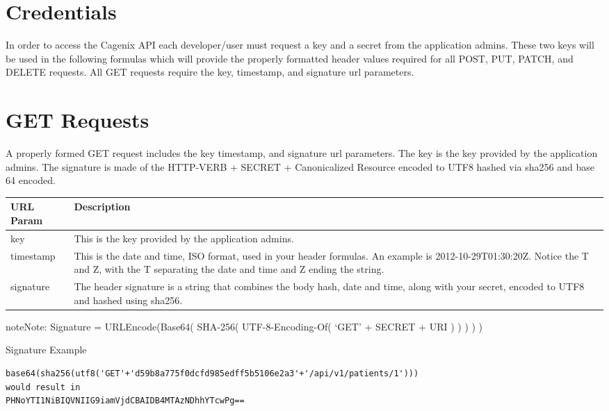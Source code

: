 \documentclass[letterpaper,10pt,english]{sphinxmanual}
\begin{document}
\section{Credentials}
\label{dev-api-overview:credentials}
In order to access the Cagenix API each developer/user must request a key and
a secret from the application admins. These two keys will be used in the
following formulas which will provide the properly formatted header values
required for all POST, PUT, PATCH, and DELETE requests. All GET requests require
the key, timestamp, and signature url parameters.


\section{GET Requests}
\label{dev-api-overview:get-requests}
A properly formed GET request includes the key timestamp, and signature url
parameters. The key is the key provided by the application admins.  The
signature is made of the HTTP-VERB + SECRET + Canonicalized Resource encoded to
UTF8 hashed via sha256 and base 64 encoded.

\begin{tabulary}{\linewidth}{|L|L|}
\hline
\textsf{\relax 
URL Param
} & \textsf{\relax 
Description
}\\
\hline
key
 & 
This is the key provided by the application admins.
\\

timestamp
 & 
This is the date and time, ISO format, used in your
header formulas. An example is 2012-10-29T01:30:20Z.
Notice the T and Z, with the T separating the date and
time and Z ending the string.
\\

signature
 & 
The header signature is a string that combines the body
hash, date and time, along with your secret, encoded to
UTF8 and hashed using sha256.
\\
\hline\end{tabulary}


\begin{notice}{note}{Note:}
Signature = URLEncode(Base64( SHA-256( UTF-8-Encoding-Of( `GET' + SECRET + URI ) ) ) ) )
\end{notice}

Signature Example

\begin{Verbatim}[commandchars=\\\{\}]
base64(sha256(utf8('GET'+'d59b8a775f0dcfd985edff5b5106e2a3'+'/api/v1/patients/1')))
would result in
PHNoYTI1NiBIQVNIIG9iamVjdCBAIDB4MTAzNDhhYTcwPg==
\end{Verbatim}
\end{document}

